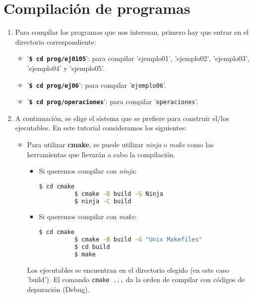 %

\section{Compilación de programas}\label{sec:compilacion}

\begin{enumerate}
  \item Para compilar los programas que nos interesan, primero hay que entrar en el directorio correspondiente:
\begin{itemize}
  \tightlist
\item '\textbf{\texttt{\$ cd prog/ej0105}}':
  para compilar '\textsf{ejemplo01}', '\textsf{ejemplo02}', '\textsf{ejemplo03}', '\textsf{ejemplo04}'
  y '\textsf{ejemplo05}'.
\item '\textbf{\texttt{\$ cd prog/ej06}}': para compilar '\texttt{ejemplo06}'.
\item '\textbf{\texttt{\$ cd prog/operaciones}}': para compilar '\texttt{operaciones}'.
\end{itemize}

\item A continuación, se elige el sistema que se prefiere para construir el/los ejecutables.
  En este tutorial consideramos los siguientes:
  \begin{itemize}
    \tightlist
  \item Para utilizar \textbf{cmake}, se puede utilizar \emph{ninja} o \emph{make} como las herramientas
    que llevarán a cabo la compilación.
    \begin{itemize}
      \item Si queremos compilar con \emph{ninja}:
        \begin{lstlisting}[language=bash]
          $ cd cmake
          $ cmake -B build -G Ninja
          $ ninja -C build
        \end{lstlisting}
      \item Si queremos compilar con \emph{make}:
        \begin{lstlisting}[language=bash]
          $ cd cmake
          $ cmake -B build -G "Unix Makefiles"
          $ cd build
          $ make
        \end{lstlisting}
    \end{itemize}
    Los ejecutables se encuentran en el directorio elegido (en este caso 'build').
    El comando \texttt{cmake ...} da la orden de compilar con códigos de depuración (\textsf{Debug}).


\end{itemize}
\end{enumerate}
